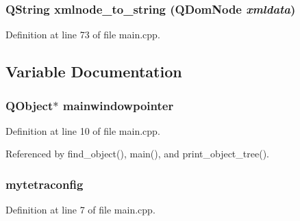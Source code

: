 \subsubsection{\setlength{\rightskip}{0pt plus 5cm}QString xmlnode\_\-to\_\-string (QDom\-Node {\em xmldata})}\label{main_8cpp_dbcd54017c14dc5f88b7ff9e17a87706}




Definition at line 73 of file main.cpp.

\subsection{Variable Documentation}
\subsubsection{\setlength{\rightskip}{0pt plus 5cm}QObject$\ast$ {\bf mainwindowpointer}}\label{main_8cpp_8d16e0096a99e911957115d6d933ed13}




Definition at line 10 of file main.cpp.

Referenced by find\_\-object(), main(), and print\_\-object\_\-tree().
\subsubsection{ {\bf mytetraconfig}}\label{main_8cpp_69bd0a7d678d494effdef51808501712}




Definition at line 7 of file main.cpp.